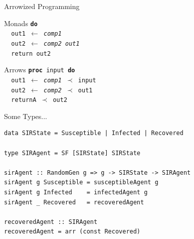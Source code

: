 \documentclass{beamer}
\begin{document}
\begin{frame}{Arrowized Programming}
\begin{block}{Monads}
\texttt{\textbf{do} \\
\hspace{\parindent} \, out1 $\leftarrow$ \textit{comp1} \\
\hspace{\parindent} \, out2 $\leftarrow$ \textit{comp2 out1} \\
\hspace{\parindent} \, return out2}
\end{block}
	
\begin{block}{Arrows}
\texttt{\textbf{proc} input \textbf{do} \\
\hspace{\parindent} \, out1 $\leftarrow$ \textit{comp1} $\prec$ input \\
\hspace{\parindent} \, out2 $\leftarrow$ \textit{comp2} $\prec$ out1 \\
\hspace{\parindent} \, returnA $\prec$ out2}
\end{block}
\end{frame}

\begin{frame}[fragile]{Some Types...}
\begin{verbatim}
data SIRState = Susceptible | Infected | Recovered

type SIRAgent = SF [SIRState] SIRState 
  
sirAgent :: RandomGen g => g -> SIRState -> SIRAgent
sirAgent g Susceptible = susceptibleAgent g
sirAgent g Infected    = infectedAgent g
sirAgent _ Recovered   = recoveredAgent

recoveredAgent :: SIRAgent
recoveredAgent = arr (const Recovered)
\end{verbatim}
\end{frame}
\end{document}

